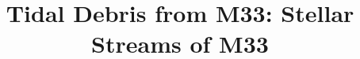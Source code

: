\documentclass{aastex63}
\begin{document}
\title{Tidal Debris from M33: Stellar Streams of M33}


\end{document}
